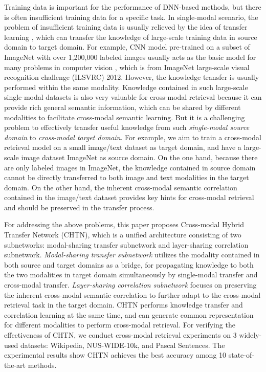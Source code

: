 \documentclass{article}
\begin{document}
Training data is important for the performance of DNN-based methods, but there is often insufficient training data for a specific task. In single-modal scenario, the problem of insufficient training data is usually relieved by the idea of transfer learning \cite{DBLP:journals/tkde/PanY10,DBLP:conf/ijcai/SamdaniY11,DBLP:conf/ijcai/ChenZ13}, which can transfer the knowledge of large-scale training data in source domain to target domain. For example, CNN model pre-trained on a subset of ImageNet \cite{DBLP:conf/cvpr/DengDSLL009} with over 1,200,000 labeled images usually acts as the basic model for many problems in computer vision \cite{DBLP:conf/nips/KrizhevskySH12}, which is from ImageNet large-scale visual recognition challenge (ILSVRC) 2012. However, the knowledge transfer is usually performed within the same modality. Knowledge contained in such large-scale single-modal datasets is also very valuable for cross-modal retrieval because it can provide rich general semantic information, which can be shared by different modalities to facilitate cross-modal semantic learning. But it is a challenging problem to effectively transfer useful knowledge from such \emph{single-modal source domain} to \emph{cross-modal target domain}. For example, we aim to train a cross-modal retrieval model on a small image/text dataset as target domain, and have a large-scale image dataset ImageNet as source domain. On the one hand, because there are only labeled images in ImageNet, the knowledge contained in source domain cannot be directly transferred to both image and text modalities in the target domain. On the other hand, the inherent cross-modal semantic correlation contained in the image/text dataset provides key hints for cross-modal retrieval and should be preserved in the transfer process.

For addressing the above problems, this paper proposes Cross-modal Hybrid Transfer Network (CHTN), which is a unified architecture consisting of two subnetworks: modal-sharing transfer subnetwork and layer-sharing correlation subnetwork. 
\emph{Modal-sharing transfer subnetwork} utilizes the modality contained in both source and target domains as a bridge, for propagating knowledge to both the two modalities in target domain simultaneously by single-modal transfer and cross-modal transfer.
\emph{Layer-sharing correlation subnetwork} focuses on preserving the inherent cross-modal semantic correlation to further adapt to the cross-modal retrieval task in the target domain.
CHTN performs knowledge transfer and correlation learning at the same time, and can generate common representation for different modalities to perform cross-modal retrieval.
For verifying the effectiveness of CHTN, we conduct cross-modal retrieval experiments on 3 widely-used datasets: Wikipedia, NUS-WIDE-10k, and Pascal Sentences. The experimental results show CHTN achieves the best accuracy among 10 state-of-the-art methods.
\end{document}
